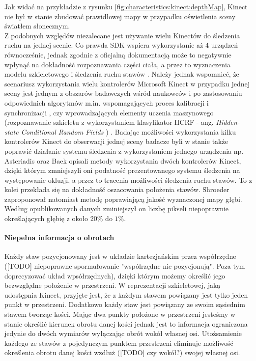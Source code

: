 Jak widać na przykładzie z rysunku \ref{fig:characteristics:kinect:depthMap}, Kinect nie był w stanie zbudować prawidłowej mapy w przypadku oświetlenia sceny światłem słonecznym. \\
Z podobnych względów niezalecane jest używanie wielu Kinectów do śledzenia ruchu na jednej scenie. Co prawda SDK wspiera wykorzystanie aż 4 urządzeń równocześnie, jednak zgodnie z oficjalną dokumentacją może to negatywnie wpłynąć na dokładność rozpoznawania części ciała, a przez to wyznaczenia modelu szkieletowego i śledzenia ruchu stawów \cite{msdn:multipleKinectsSDK2016}. Należy jednak wspomnieć, że scenariusz wykorzystania wielu kontrolerów Microsoft Kinect w przypadku jednej sceny jest jednym z obszarów badawczych wśród naukowców i po zastosowaniu odpowiednich algorytmów m.in.  wspomagających proces kalibracji i synchronizacji \cite{Kohno2013}, czy wprowadzających elementy uczenia maszynowego (rozpoznawanie szkieletu z wykorzystaniem klasyfikator HCRF - ang. \emph{Hidden-state Conditional Random Fields }) \cite{Kitsikidis2011}. Badając możliwości wykorzystania kilku kontrolerów Kinect do obserwacji jednej sceny badacze byli w stanie także poprawić działanie systemu śledzenia z wykorzystaniem jednego urządzenia np. Asteriadis \cite{Asteriadis2013} oraz Baek \cite{Baek2014} opisali metody wykorzystania dwóch kontrolerów Kinect, dzięki którym zmniejszyli oni podatność prezentowanego systemu śledzenia na występowanie okluzji, a przez to tracenia możliwości śledzenia ruchu stawów. To z kolei przekłada się na dokładność oszacowania położenia stawów. Shroeder \cite{Schroder2011} zaproponował natomiast metodę poprawiającą jakość wyznaczonej mapy głębi. Według opublikowanych danych zminiejszył on liczbę pikseli niepoprawnie określających głębię z około $20\%$ do $1\%$.

\paragraph*{Niepełna informacja o obrotach}
Każdy staw pozycjonowany jest w układzie kartezjańskim przez współrzędne ([TODO] niepoprawne spormułowanie "wspólrzędne nie pozycjonują". Poza tym doprecyzować układ wpsółrzędnych), dzięki którym możemy określić jego bezwzględne położenie w przestrzeni. W reprezentacji szkieletowej, jaką udostępnia Kinect, przyjęte jest, że z każdym stawem powiązany jest tylko jeden punkt w przestrzeni. Dodatkowo każdy staw jest powiązany ze swoim sąsiednim stawem tworząc kości. Mając dwa punkty położone w przestrzeni jesteśmy w stanie określić kierunek obrotu danej kości jednak jest to informacja ograniczona jedynie do dwóch wymiarów wyłączając obrót wokół własnej osi. Utożsamienie każdego ze stawów z pojedynczym punktem przestrzeni eliminuje możliwość określenia obrotu danej kości wzdłuż ([TODO] czy wokół?) swojej własnej osi.

